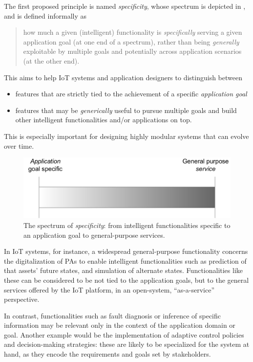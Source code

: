 The first proposed principle is named \emph{specificity}, whose spectrum is depicted in , and is defined informally as 
\begin{quote}
    how much a given (intelligent) functionality is \emph{specifically} serving a given application goal (at one end of a spectrum), rather than being \emph{generally} exploitable by multiple goals and potentially across application scenarios (at the other end).
\end{quote}
%
This aims to help IoT systems and application designers to distinguish between
\begin{itemize}
    \item features that are strictly tied to the achievement of a specific \emph{application goal}
    \item features that may be \emph{generically} useful to pursue multiple goals and build other intelligent functionalities and/or applications on top.
\end{itemize}
%
This is especially important for designing highly modular systems that can evolve over time.

\begin{figure}
    \centering
    \includegraphics[width=.6\columnwidth]{figures/dt-mas/specificity-spectrum.pdf}
    \caption{The spectrum of \emph{specificity}: from intelligent functionalities specific to an application goal to general-purpose services.}
    \label{fig:specificity}
\end{figure}

In IoT systems, for instance, a widespread general-purpose functionality concerns the digitalization of \acp{PA} to enable intelligent functionalities such as prediction of that assets' future states, and simulation of alternate states. 
%
Functionalities like these can be considered to be not tied to the application goals, but to the general services offered by the IoT platform, in an open-system, ``as-a-service'' perspective.

In contrast, functionalities such as fault diagnosis or inference of specific information may be relevant only in the context of the application domain or goal. 
Another example would be the implementation of adaptive control policies and decision-making strategies: these are likely to be specialized for the system at hand, as they encode the requirements and goals set by stakeholders. 

